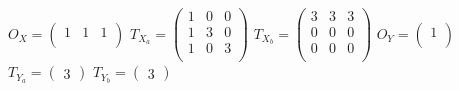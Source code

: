 \documentclass[3p]{elsarticle}
\newcommand{\setproduct}{\times} %
\begin{document}
\begin{center}
$O_X= \left(%
\begin{array}{ccc}
  1 & 1 & 1 \\
\end{array}\right)$
$T_{X_a}=\left(%
\begin{array}{ccc}
  1 & 0 & 0 \\
  1 & 3 & 0 \\
  1 & 0 & 3 \\
\end{array}\right)$
$T_{X_b}=\left(%
\begin{array}{ccc}
  3 & 3 & 3 \\
  0 & 0 & 0 \\
  0 & 0 & 0 \\
\end{array}\right)$
\hspace{0.2cm}
$O_Y= \left(%
\begin{array}{c}
  1 \\
\end{array}\right)$
$T_{Y_a}=\left(%
\begin{array}{c}
  3
\end{array}\right)$
$T_{Y_b}=\left(%
\begin{array}{c}
  3
\end{array}\right)$
\end{center}
%
%
%
%
%
%
\end{document}
